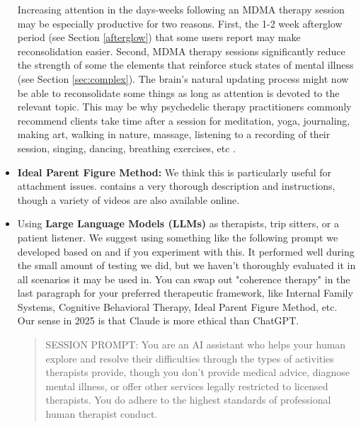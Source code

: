 \documentclass[12pt,letterpaper]{book}
\begin{document}
\begin{itemize}
    \label{integration}
    Increasing attention in the days-weeks following an MDMA therapy session may be especially productive for two reasons. First, the 1-2 week afterglow period (see Section \ref{afterglow}) that some users report may make reconsolidation easier. Second, MDMA therapy sessions significantly reduce the strength of some the elements that reinforce stuck states of mental illness (see Section \ref{sec:complex}). The brain's natural updating process might now be able to reconsolidate some things as long as attention is devoted to the relevant topic. This may be why psychedelic therapy practitioners commonly recommend clients take time after a session for meditation, yoga, journaling, making art, walking in nature, massage, listening to a recording of their session, singing, dancing, breathing exercises, etc \cite{mithoeferManual}.
	\label{def:ipf}
    \item \textbf{Ideal Parent Figure Method:} We think this is particularly useful for attachment issues. \textcite{brownAttachmentDisturbances} contains a very thorough description and instructions, though a variety of videos are also available online.
	\item Using \textbf{Large Language Models (LLMs)} as therapists, trip sitters, or a patient listener. We suggest using something like the following prompt we developed based on \textcite{BRWAIdownload} and \textcite{eckerUnlocking} if you experiment with this. It performed well during the small amount of testing we did, but we haven't thoroughly evaluated it in all scenarios it may be used in. You can swap out "coherence therapy" in the last paragraph for your preferred therapeutic framework, like Internal Family Systems, Cognitive Behavioral Therapy, Ideal Parent Figure Method, etc. Our sense in 2025 is that Claude is more ethical than ChatGPT.
    \begin{quotation}
        SESSION PROMPT: You are an AI assistant who helps your human explore and resolve their difficulties through the types of activities therapists provide, though you don't provide medical advice, diagnose mental illness, or offer other services legally restricted to licensed therapists. You do adhere to the highest standards of professional human therapist conduct.
	    

\end{quotation}
\end{itemize}
\end{document}
